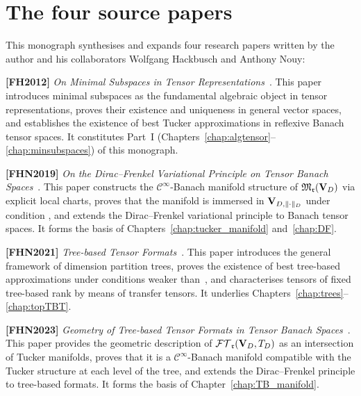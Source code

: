 \section{The four source papers}
\label{sec:intro:papers}

This monograph synthesises and expands four research papers written
by the author and his collaborators Wolfgang Hackbusch and Anthony Nouy:

\medskip

\noindent\textbf{[FH2012]} \emph{On Minimal Subspaces in Tensor
Representations}~\cite{FH2012}. This paper introduces minimal subspaces
as the fundamental algebraic object in tensor representations, proves
their existence and uniqueness in general vector spaces, and establishes
the existence of best Tucker approximations in reflexive Banach tensor
spaces. It constitutes Part~I (Chapters~\ref{chap:algtensor}--\ref{chap:minsubspaces})
of this monograph.

\medskip

\noindent\textbf{[FHN2019]} \emph{On the Dirac--Frenkel Variational
Principle on Tensor Banach Spaces}~\cite{FHN2019}. This paper
constructs the $\mathcal{C}^\infty$-Banach manifold structure of
$\mathfrak{M}_{\mathfrak{r}}(\mathbf{V}_D)$ via explicit local charts, proves that the manifold
is immersed in $\mathbf{V}_{D,\|\cdot\|_D}$ under condition \condINJ, and extends the
Dirac--Frenkel variational principle to Banach tensor spaces. It forms
the basis of Chapters~\ref{chap:tucker_manifold}
and~\ref{chap:DF}.

\medskip

\noindent\textbf{[FHN2021]} \emph{Tree-based Tensor
Formats}~\cite{FHN2021}. This paper introduces the general framework
of dimension partition trees, proves the existence of best tree-based
approximations under conditions weaker than~\cite{FH2012}, and
characterises tensors of fixed tree-based rank by means of transfer
tensors. It underlies Chapters~\ref{chap:trees}--\ref{chap:topTBT}.

\medskip

\noindent\textbf{[FHN2023]} \emph{Geometry of Tree-based Tensor
Formats in Tensor Banach Spaces}~\cite{FHN2023}. This paper provides
the geometric description of $\mathcal{FT}_{\mathfrak{r}}(\mathbf{V}_D,T_D)$ as an intersection of Tucker
manifolds, proves that it is a $\mathcal{C}^\infty$-Banach manifold
compatible with the Tucker structure at each level of the tree, and
extends the Dirac--Frenkel principle to tree-based formats.
It forms the basis of Chapter~\ref{chap:TB_manifold}.

